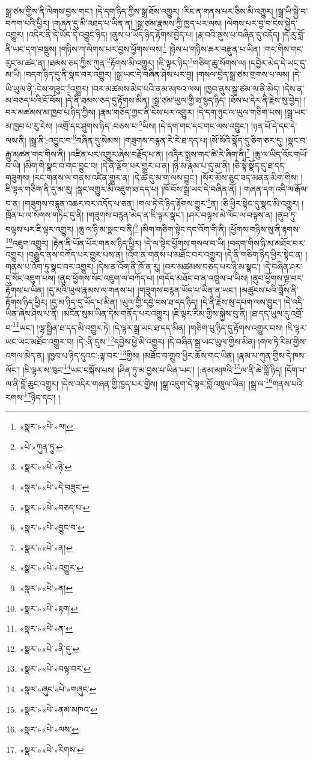 སྒྲ་ཙམ་གྱིས་ནི་ལེགས་བྱས་གང་། །དེ་དག་ཉིད་ཀྱིས་སྒྲ་ཐོས་འགྱུར། །རིང་ན་གནས་པར་ཅིས་མི་འགྱུར། །སྒྲ་ཡི་སྐྱེ་བ་བཀག་པའི་ཕྱིར། །གཞན་དུ་མི་འཐད་པ་ཡིན་ན། །སྒྲ་ཙམ་རྣམས་ཀྱི་ཁྱད་པར་ལས། །ལེགས་པར་བྱ་བ་ངེས་སྐྱེད་འགྱུར། །འདིར་ནི་དེ་ཡོད་དེ་འབྱུང་ཉིད། །ནུས་པ་ཡོད་ཉིད་རྟོགས་བྱེད་པ། །རྣ་བའི་ནུས་པ་བཞིན་དུ་འདོད། །དེ་རུ་བློ་ནི་ཡང་དག་བསྡུས། །གཉིས་ཀ་ལེགས་པར་བྱས་ཕྱོགས་ལས།\footnote{«སྣར་»«པེ་»ལ།} །ཉེས་པ་གཉིས་ཆར་བརྫུན་པ་ཡིན། །གང་གིས་གང་རུང་མ་ཚང་ན། །ཐམས་ཅད་ཀྱིས་ཀུན་\footnote{«པེ་»ཀུན་ཏུ་}རྟོགས་མི་འགྱུར། །ཇི་ལྟར་ཉིད་\footnote{«སྣར་»«པེ་»ཉེ་}གཅིག་ཆུ་སོགས་ལ། །དབྱེར་མེད་དེ་ཡང་དུ་མ་ཡི། །བདག་ཉིད་དུ་ནི་སྣང་བར་འགྱུར། །སྒྲ་ཡང་དེ་བཞིན་ཤེས་པར་བྱ། །གསལ་བྱེད་སྒྲ་ཙམ་གྲགས་པ་ལས། །དེ་ཡི་ཡུལ་ནི་:ངེས་གཟུང་\footnote{«སྣར་»«པེ་»དེ་བཟུང་}འགྱུར། །བར་མཚམས་མེད་པའི་ནམ་མཁའ་ལས། །ཁྱབ་ནུས་སྒྲ་ཙམ་ལ་ནི་མེད། །དེས་ན་མ་བཅད་པའི་ངོ་བོས། །དེ་ནི་ཐམས་ཅད་དུ་རྟོགས་མིན། །སྒྲ་ཙམ་ཡུལ་གྱི་ཐ་སྙད་ཉིད། །ཐོས་པ་དེར་ནི་རྗེས་སུ་བྱེད། །བར་མཚམས་མ་ཁྱབ་པ་ཉིད་ཀྱིས། །རྣམ་གཅོད་ཀྱང་ནི་ངེས་པར་འགྱུར། །དེ་དག་ཉུང་ལ་ཡུལ་གཅིག་པས། །སྒྲ་ཡང་མ་ཁྱབ་པ་རུ་ངེས། །འགྲོ་དང་ཤུགས་ཉིད་:བཅས་པ་\footnote{«སྣར་»«པེ་»བཅད་པ་}ཡིས། །དེ་དག་གང་དང་གང་ལས་འབྱུང་། །ཉན་པོ་དེ་དང་དེ་ལས་ནི། །སྒྲ་ནི་:འབྱུང་བ་\footnote{«སྣར་»«པེ་»བྱུང་བ་}བཞིན་དུ་སེམས། །གཟུགས་བརྙན་རེ་རེ་ཐ་དད་པ། །སོ་སོའི་སྣོད་དུ་ཅིག་ཅར་དུ། །སྣང་བ་རྒྱུ་མཚན་གང་གིས་ནི། །འཛིན་པར་འགྱུར་ཞེས་བརྗོད་པ་ན། །འདིར་སྨྲས་གང་ཚེ་རེ་ཞིག་ནི།\footnote{«སྣར་»«པེ་»ན།} །ཆུ་ལ་ཡིད་འོང་གཡོ་བ་ཡི། །མིག་གི་སྣང་བ་གང་བྱུང་བ། །དེ་ནི་ལྡོག་པར་གྱུར་པ་ན། །ཉི་མ་རྣམ་པ་དུ་མ་ནི། །ཅི་སྟེ་སྣོད་དུ་ཐ་དད་གཟུགས། །རང་གནས་ལ་གནས་འཛིན་གྱུར་ན། །དེ་ཚེ་དུ་མ་ག་ལས་བྱུང་། །སོར་མོས་ཅུང་ཟད་མནན་མིག་གིས། །ཇི་ལྟར་གཅིག་ནི་དུ་མ་རུ། །སྣང་འགྱུར་མི་འཇུག་ཐ་དད་པ། །ཁོ་བོས་སྒྲ་ཡང་དེ་བཞིན་ནོ། །
གཞན་དག་འདི་ལ་རྒོལ་བ་ན། །གཟུགས་བརྙན་འཆར་བར་འདོད་པ་ཅན། །གལ་ཏེ་དེ་ཉིད་རྟོགས་གྱུར་\footnote{«སྣར་»«པེ་»འགྱུར་}ན། །ཅི་ཕྱིར་སྟེང་དུ་སྣང་མི་འགྱུར། །ཁྲོན་པ་ལ་སོགས་གཏིང་དུ་ནི། །གཟུགས་བརྙན་མེད་ན་ཇི་ལྟར་སྣང་། །ཤར་བལྟས་མེ་ལོང་ལ་བལྟས་ན། །ནུབ་ཏུ་བལྟས་པར་ཇི་ལྟར་འགྱུར། །ཆུ་ལ་ཉི་མ་སྣང་བ་ནི།\footnote{«སྣར་»«པེ་»ན།} །མིག་གཅིག་སྟེང་དང་འོག་གི་ནི། །ཕྱོགས་གཉིས་སུ་ནི་རྟགས་\footnote{«སྣར་»«པེ་»རྟག་}འཇུག་འགྱུར། །རྟེན་ནི་ཡོན་པོར་གནས་ཉིད་ཕྱིར། །དེ་ལ་སྟེང་ཕྱོགས་གསལ་བ་ཡི། །བདག་གིས་ཉི་མ་མཐོང་བར་འགྱུར། །བརྒྱུད་ནས་བཀོད་པར་གྱུར་པས་ན། །འོག་ན་གནས་པ་མཐོང་བར་འགྱུར། །དེ་ནི་གཅིག་ཉིད་ཕྱིར་སྟེང་ན། །གནས་པ་འོག་ཏུ་སྣང་བར་འགྱུར། །དེས་ན་འོག་ནི་ཁོ་ན་རུ། །བར་མཚམས་བཅད་པར་ཉི་མ་སྣང་། །དེ་བཞིན་ཤར་དུ་སོང་འཇུག་པས། །ནུབ་ཕྱོགས་སོང་འཇུག་ལ་བཀོད་པ། །གདོད་མཐོང་བ་ན་འཁྲུལ་པ་ཡིས། །ནུབ་ཕྱོགས་ལྟ་བར་རྟོགས་པ་ཡིན། །དུ་མའི་ཡུལ་རྣམས་ལ་གནས་པ། །གཟུགས་བརྙན་ཡོད་པ་ཡིན་ན་ཡང་། །མཚུངས་པའི་བློས་ནི་རྟོགས་ཉིད་ཕྱིར། །དུ་མ་ཉིད་དུ་ཡོད་པ་མིན། །ཡུལ་གྱི་དབྱེ་བས་ཐ་དད་ཉིད། །དེ་ནི་རྗེས་སུ་དཔག་ལས་བྱུང་། །དེ་འདི་ཡིན་ཞེས་ཤེས་པ་ནི། །མངོན་སུམ་ཡིན་དེས་གནོད་པར་འགྱུར། །ཇི་ལྟར་རིམ་གྱིས་སྐྱེས་བུ་ནི། །ཐ་དད་ཡུལ་དུ་འགྲོ་བ་\footnote{«སྣར་»«པེ་»ན་}ཡང་། །ལྷ་སྦྱིན་ཐ་དད་མི་འགྱུར་ཏེ། །དེ་ལྟར་སྒྲ་ཡང་ཐ་དད་མིན། །གཅིག་པུ་ཉིད་དུ་རྟོགས་འགྱུར་བས། །ཇི་ལྟར་ཡང་ཡང་མཐོང་འགྱུར་བ། །དེ་:ནི་དུས་\footnote{«སྣར་»«པེ་»ནི་དུ་}དབྱེས་ཕྱེ་མི་འགྱུར། །དེ་བཞིན་སྒྲ་ཡང་ཡུལ་གྱིས་མིན། །གལ་ཏེ་རིམ་གྱིས་འགལ་མེད་ན། །ཁྱབ་པ་ཉིད་དུའང་:ལྟ་བར་\footnote{«སྣར་»«པེ་»བལྟ་བར་}གྱིས། །མཐོང་བ་གྲུབ་ཕྱིར་ཆོས་གང་ཡིན། །རྣམ་པ་ཀུན་གྱིས་དེ་ཁས་ལོང་། །ཇི་ལྟར་ས་ཁུང་\footnote{«སྣར་»ཞུང་«པེ་»གཞུང་}ཡང་བསྐོས་པས། །ཤིན་ཏུ་མ་བྱས་པ་ཡིན་ཡང་། །:ནམ་མཁའི་\footnote{«སྣར་»«པེ་»ནམ་མཁའ་}ལ་ནི་ཆེ་བློ་ཉིད། །དོག་པ་ལ་ནི་བློ་ཆུང་འགྱུར། །དེས་འདིར་གཞན་གྱི་ཁྱད་པར་གྱིས། །སྒྲ་འཇུག་དེ་ལྟར་བློ་འཁྲུལ་ཡིན། །སྒྲ་ལ་\footnote{«སྣར་»«པེ་»ལས་}གནས་པའི་རགས་\footnote{«སྣར་»«པེ་»རིགས་}ཉིད་དང་། །
